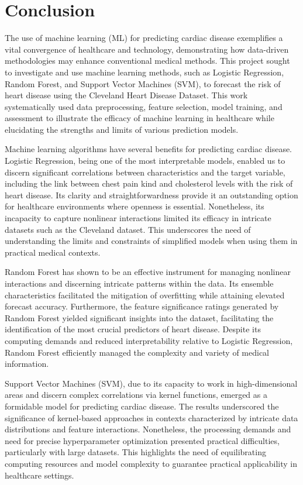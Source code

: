\section{Conclusion}

The use of machine learning (ML) for predicting cardiac disease exemplifies a vital convergence of healthcare and technology, demonstrating how data-driven methodologies may enhance conventional medical methods. This project sought to investigate and use machine learning methods, such as Logistic Regression, Random Forest, and Support Vector Machines (SVM), to forecast the risk of heart disease using the Cleveland Heart Disease Dataset. This work systematically used data preprocessing, feature selection, model training, and assessment to illustrate the efficacy of machine learning in healthcare while elucidating the strengths and limits of various prediction models.

Machine learning algorithms have several benefits for predicting cardiac disease. Logistic Regression, being one of the most interpretable models, enabled us to discern significant correlations between characteristics and the target variable, including the link between chest pain kind and cholesterol levels with the risk of heart disease. Its clarity and straightforwardness provide it an outstanding option for healthcare environments where openness is essential. Nonetheless, its incapacity to capture nonlinear interactions limited its efficacy in intricate datasets such as the Cleveland dataset. This underscores the need of understanding the limits and constraints of simplified models when using them in practical medical contexts.

Random Forest has shown to be an effective instrument for managing nonlinear interactions and discerning intricate patterns within the data. Its ensemble characteristics facilitated the mitigation of overfitting while attaining elevated forecast accuracy. Furthermore, the feature significance ratings generated by Random Forest yielded significant insights into the dataset, facilitating the identification of the most crucial predictors of heart disease. Despite its computing demands and reduced interpretability relative to Logistic Regression, Random Forest efficiently managed the complexity and variety of medical information.

Support Vector Machines (SVM), due to its capacity to work in high-dimensional areas and discern complex correlations via kernel functions, emerged as a formidable model for predicting cardiac disease. The results underscored the significance of kernel-based approaches in contexts characterized by intricate data distributions and feature interactions. Nonetheless, the processing demands and need for precise hyperparameter optimization presented practical difficulties, particularly with large datasets. This highlights the need of equilibrating computing resources and model complexity to guarantee practical applicability in healthcare settings.

